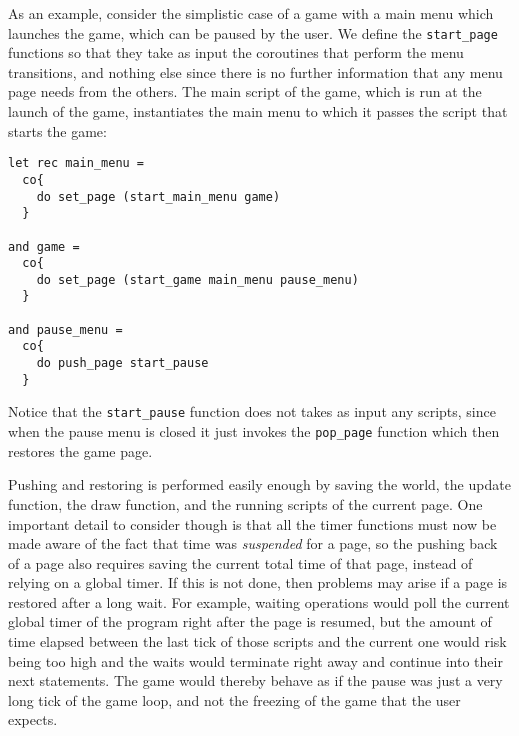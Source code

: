 As an example, consider the simplistic case of a game with a main menu which launches the game, which can be paused by the user. We define the \texttt{start\_page} functions so that they take as input the coroutines that perform the menu transitions, and nothing else since there is no further information that any menu page needs from the others. The main script of the game, which is run at the launch of the game, instantiates the main menu to which it passes the script that starts the game:

\begin{lstlisting}
let rec main_menu = 
  co{
    do set_page (start_main_menu game)
  }
  
and game = 
  co{
    do set_page (start_game main_menu pause_menu)
  }
  
and pause_menu = 
  co{
    do push_page start_pause
  }
\end{lstlisting}

Notice that the \texttt{start\_pause} function does not takes as input any scripts, since when the pause menu is closed it just invokes the \texttt{pop\_page} function which then restores the game page.

Pushing and restoring is performed easily enough by saving the world, the update function, the draw function, and the running scripts of the current page. 
One important detail to consider though is that all the timer functions must now be made aware of the fact that time was \textit{suspended} for a page, so the pushing back of a page also requires saving the current total time of that page, instead of relying on a global timer. If this is not done, then problems may arise if a page is restored after a long wait. For example, waiting operations would poll the current global timer of the program right after the page is resumed, but the amount of time elapsed between the last tick of those scripts and the current one would risk being too high and the waits would terminate right away and continue into their next statements. The game would thereby behave as if the pause was just a very long tick of the game loop, and not the freezing of the game that the user expects.
